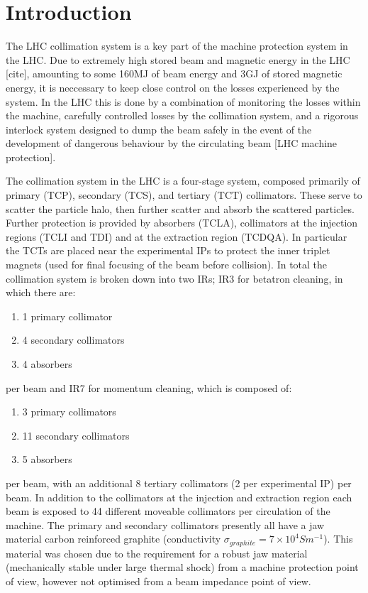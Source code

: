 \section{Introduction}

The LHC collimation system is a key part of the machine protection system in the LHC. Due to extremely high stored beam and magnetic energy in the LHC [cite], amounting to some 160MJ of beam energy and 3GJ of stored magnetic energy, it is neccessary to keep close control on the losses experienced by the system. In the LHC this is done by a combination of monitoring the losses within the machine, carefully controlled losses by the collimation system, and a rigorous interlock system designed to dump the beam safely in the event of the development of dangerous behaviour by the circulating beam [LHC machine protection].

The collimation system in the LHC is a four-stage system, composed primarily of primary (TCP), secondary (TCS), and tertiary (TCT) collimators. These serve to scatter the particle halo, then further scatter and absorb the scattered particles. Further protection is provided by absorbers (TCLA), collimators at the injection regions (TCLI and TDI) and at the extraction region (TCDQA). In particular the TCTs are placed near the experimental IPs to protect the inner triplet magnets (used for final focusing of the beam before collision). In total the collimation system is broken down into two IRs; IR3 for betatron cleaning, in which there are:

\begin{enumerate}
\item{1 primary collimator}
\item{4 secondary collimators}
\item{4 absorbers}
\end{enumerate}

per beam and IR7 for momentum cleaning, which is composed of:

\begin{enumerate}
\item{3 primary collimators}
\item{11 secondary collimators}
\item{5 absorbers}
\end{enumerate}

per beam, with an additional 8 tertiary collimators (2 per experimental IP) per beam. In addition to the collimators at the injection and extraction region each beam is exposed to 44 different moveable collimators per circulation of the machine. The primary and secondary collimators presently all have a jaw material carbon reinforced graphite (conductivity $\sigma_{graphite} = 7 \times 10^{4} S m^{-1} $). This material was chosen due to the requirement for a robust jaw material (mechanically stable under large thermal shock) from a machine protection point of view, however not optimised from a beam impedance point of view.

